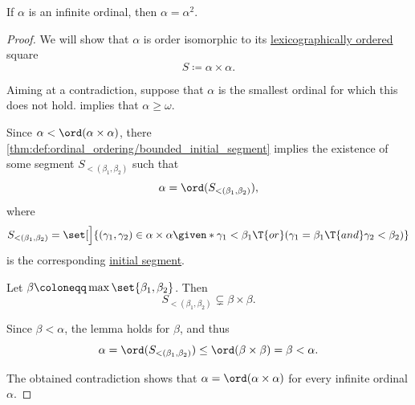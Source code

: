 \begin{proposition}\label{thm:square_of_infinite_ordinal}
  If \( \alpha \) is an infinite ordinal, then \( \alpha = \alpha^2 \).
\end{proposition}
\begin{proof}
  We will show that \( \alpha \) is order isomorphic to its \hyperref[def:lexicographic_order]{lexicographically ordered} square
  \begin{equation*}
    S \coloneqq \alpha \times \alpha.
  \end{equation*}

  Aiming at a contradiction, suppose that \( \alpha \) is the smallest ordinal for which this does not hold.  implies that \( \alpha \geq \omega \).

  Since \( \alpha < \ord(\alpha \times \alpha) \), there \cref{thm:def:ordinal_ordering/bounded_initial_segment} implies the existence of some segment \( S_{<(\beta_1, \beta_2)} \) such that
  \begin{equation*}
    \alpha = \ord(S_{<(\beta_1, \beta_2)}),
  \end{equation*}
  where
  \begin{equation*}
    S_{<(\beta_1, \beta_2)} = \set[\Big]{ (\gamma_1, \gamma_2) \in \alpha \times \alpha \given* \gamma_1 < \beta_1 \T{or} (\gamma_1 = \beta_1 \T{and} \gamma_2 < \beta_2) }
  \end{equation*}
  is the corresponding \hyperref[def:order_interval/unbounded]{initial segment}.

  Let \( \beta \coloneqq \max\set{ \beta_1, \beta_2 } \). Then
  \begin{equation*}
    S_{<(\beta_1, \beta_2)} \subsetneq \beta \times \beta.
  \end{equation*}

  Since \( \beta < \alpha \), the lemma holds for \( \beta \), and thus
  \begin{equation*}
    \alpha
    =
    \ord(S_{<(\beta_1, \beta_2)})
    \leq
    \ord(\beta \times \beta)
    =
    \beta
    <
    \alpha.
  \end{equation*}

  The obtained contradiction shows that \( \alpha = \ord(\alpha \times \alpha) \) for every infinite ordinal \( \alpha \).
\end{proof}

